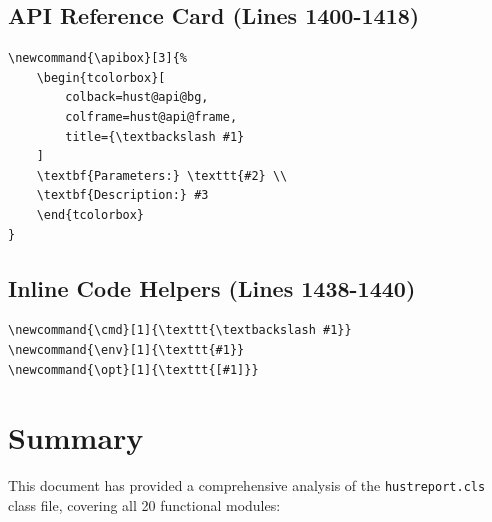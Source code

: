 \documentclass[linux]{hustreport}
\begin{document}
\subsection{API Reference Card (Lines 1400-1418)}

\begin{verbatim}
\newcommand{\apibox}[3]{%
    \begin{tcolorbox}[
        colback=hust@api@bg,
        colframe=hust@api@frame,
        title={\textbackslash #1}
    ]
    \textbf{Parameters:} \texttt{#2} \\
    \textbf{Description:} #3
    \end{tcolorbox}
}
\end{verbatim}

\subsection{Inline Code Helpers (Lines 1438-1440)}

\begin{verbatim}
\newcommand{\cmd}[1]{\texttt{\textbackslash #1}}
\newcommand{\env}[1]{\texttt{#1}}
\newcommand{\opt}[1]{\texttt{[#1]}}
\end{verbatim}

\newpage
\section*{Summary}

This document has provided a comprehensive analysis of the \texttt{hustreport.cls} class file, covering all 20 functional modules:
\end{document}
